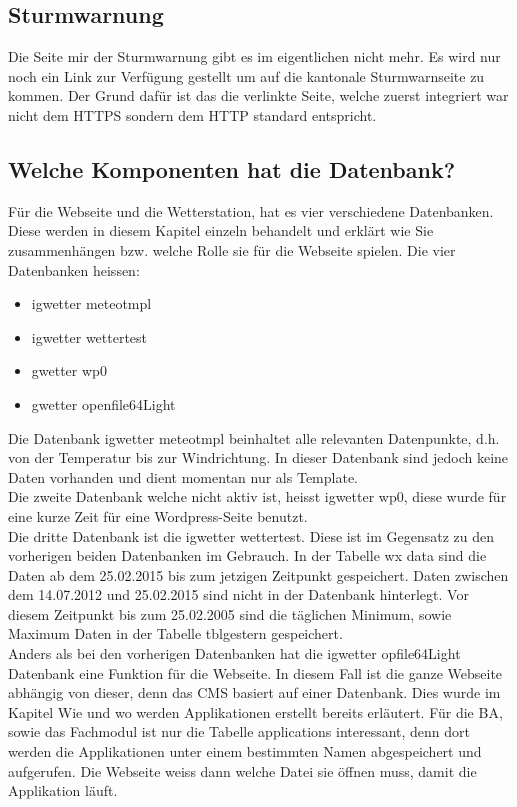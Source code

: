 \documentclass[a4paper,ngerman, 11pt]{report}
\begin{document}
\subsection{Sturmwarnung}
Die Seite mir der Sturmwarnung gibt es im eigentlichen nicht mehr. Es wird nur noch ein Link zur Verfügung gestellt um auf die kantonale Sturmwarnseite zu kommen. Der Grund dafür ist das die verlinkte Seite, welche zuerst integriert war nicht dem HTTPS sondern dem HTTP standard entspricht. 

\subsection{Welche Komponenten hat die Datenbank?}
Für die Webseite und die Wetterstation, hat es vier verschiedene Datenbanken. Diese werden in diesem Kapitel einzeln behandelt und erklärt wie Sie zusammenhängen bzw. welche Rolle sie für die Webseite spielen. Die vier Datenbanken heissen:
\begin{itemize}  
\item igwetter meteotmpl
\item igwetter wettertest
\item gwetter wp0
\item gwetter openfile64Light
\end{itemize}

Die Datenbank igwetter meteotmpl beinhaltet alle relevanten Datenpunkte, d.h. von der Temperatur bis zur Windrichtung. In dieser Datenbank sind jedoch keine Daten vorhanden und dient momentan nur als Template.\\
Die zweite Datenbank welche nicht aktiv ist, heisst igwetter wp0, diese wurde für eine kurze Zeit für eine Wordpress-Seite benutzt.\\
Die dritte Datenbank ist die igwetter wettertest. Diese ist im Gegensatz zu den vorherigen beiden Datenbanken im Gebrauch. In der Tabelle wx data sind die Daten ab dem 25.02.2015 bis zum jetzigen Zeitpunkt gespeichert. Daten zwischen dem 14.07.2012 und 25.02.2015 sind nicht in der Datenbank hinterlegt. Vor diesem Zeitpunkt bis zum 25.02.2005 sind die täglichen Minimum, sowie Maximum Daten in der Tabelle tblgestern gespeichert.\\
Anders als bei den vorherigen Datenbanken hat die igwetter opfile64Light Datenbank eine Funktion für die Webseite. In diesem Fall ist die ganze Webseite abhängig von dieser, denn das CMS basiert auf einer Datenbank. Dies wurde im Kapitel Wie und wo werden Applikationen erstellt bereits erläutert. Für die BA, sowie das Fachmodul ist nur die Tabelle applications interessant, denn dort werden die Applikationen unter einem bestimmten Namen abgespeichert und aufgerufen. Die Webseite weiss dann welche Datei sie öffnen muss, damit die Applikation läuft.\\
\end{document}
